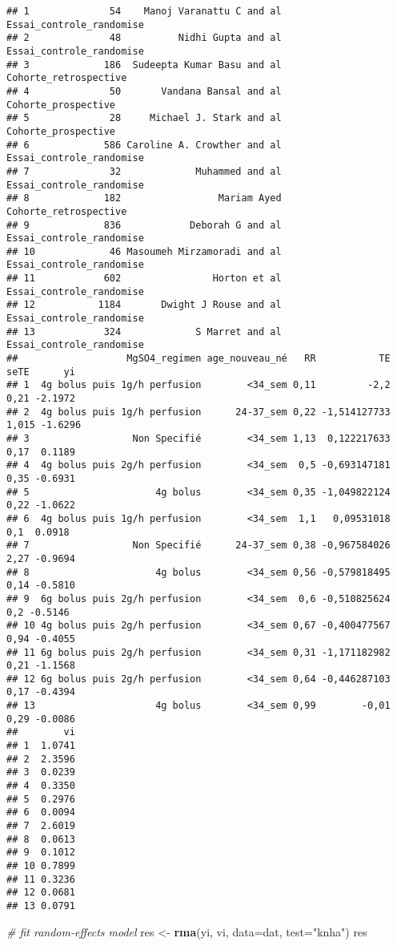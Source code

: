 \documentclass[
]{article}
\newenvironment{Shaded}{\begin{snugshade}}{\end{snugshade}}
\newcommand{\AttributeTok}[1]{\textcolor[rgb]{0.13,0.29,0.53}{#1}}
\newcommand{\CommentTok}[1]{\textcolor[rgb]{0.56,0.35,0.01}{\textit{#1}}}
\newcommand{\FunctionTok}[1]{\textcolor[rgb]{0.13,0.29,0.53}{\textbf{#1}}}
\newcommand{\NormalTok}[1]{#1}
\newcommand{\OtherTok}[1]{\textcolor[rgb]{0.56,0.35,0.01}{#1}}
\newcommand{\StringTok}[1]{\textcolor[rgb]{0.31,0.60,0.02}{#1}}
\begin{document}
\begin{verbatim}
## 1              54    Manoj Varanattu C and al Essai_controle_randomise 
## 2              48          Nidhi Gupta and al Essai_controle_randomise 
## 3             186  Sudeepta Kumar Basu and al    Cohorte_retrospective 
## 4              50       Vandana Bansal and al      Cohorte_prospective 
## 5              28     Michael J. Stark and al      Cohorte_prospective 
## 6             586 Caroline A. Crowther and al Essai_controle_randomise 
## 7              32             Muhammed and al Essai_controle_randomise 
## 8             182                 Mariam Ayed    Cohorte_retrospective 
## 9             836            Deborah G and al Essai_controle_randomise 
## 10             46 Masoumeh Mirzamoradi and al Essai_controle_randomise 
## 11            602                Horton et al Essai_controle_randomise 
## 12           1184       Dwight J Rouse and al Essai_controle_randomise 
## 13            324             S Marret and al Essai_controle_randomise 
##                   MgSO4_regimen age_nouveau_né   RR           TE  seTE      yi 
## 1  4g bolus puis 1g/h perfusion        <34_sem 0,11         -2,2  0,21 -2.1972 
## 2  4g bolus puis 1g/h perfusion      24-37_sem 0,22 -1,514127733 1,015 -1.6296 
## 3                  Non Specifié        <34_sem 1,13  0,122217633  0,17  0.1189 
## 4  4g bolus puis 2g/h perfusion        <34_sem  0,5 -0,693147181  0,35 -0.6931 
## 5                      4g bolus        <34_sem 0,35 -1,049822124  0,22 -1.0622 
## 6  4g bolus puis 1g/h perfusion        <34_sem  1,1   0,09531018   0,1  0.0918 
## 7                  Non Specifié      24-37_sem 0,38 -0,967584026  2,27 -0.9694 
## 8                      4g bolus        <34_sem 0,56 -0,579818495  0,14 -0.5810 
## 9  6g bolus puis 2g/h perfusion        <34_sem  0,6 -0,510825624   0,2 -0.5146 
## 10 4g bolus puis 2g/h perfusion        <34_sem 0,67 -0,400477567  0,94 -0.4055 
## 11 6g bolus puis 2g/h perfusion        <34_sem 0,31 -1,171182982  0,21 -1.1568 
## 12 6g bolus puis 2g/h perfusion        <34_sem 0,64 -0,446287103  0,17 -0.4394 
## 13                     4g bolus        <34_sem 0,99        -0,01  0,29 -0.0086 
##        vi 
## 1  1.0741 
## 2  2.3596 
## 3  0.0239 
## 4  0.3350 
## 5  0.2976 
## 6  0.0094 
## 7  2.6019 
## 8  0.0613 
## 9  0.1012 
## 10 0.7899 
## 11 0.3236 
## 12 0.0681 
## 13 0.0791
\end{verbatim}

\begin{Shaded}
\begin{Highlighting}[]
\CommentTok{\# fit random{-}effects model}
\NormalTok{res }\OtherTok{\textless{}{-}} \FunctionTok{rma}\NormalTok{(yi, vi, }\AttributeTok{data=}\NormalTok{dat, }\AttributeTok{test=}\StringTok{"knha"}\NormalTok{)}
\NormalTok{res}
\end{Highlighting}
\end{Shaded}
\end{document}
